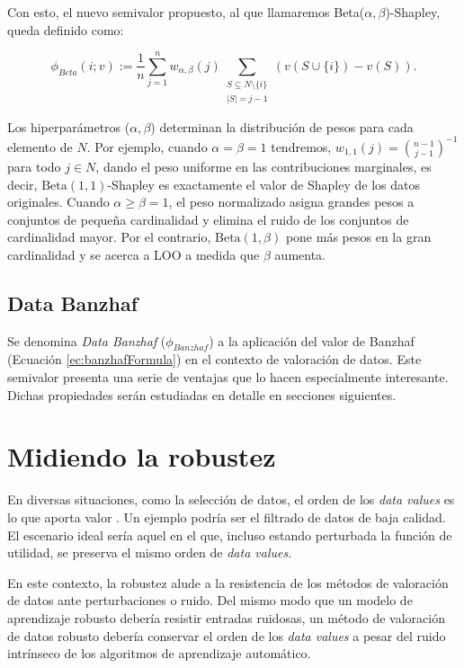 Con esto, el nuevo semivalor propuesto, al que llamaremos
Beta($\alpha, \beta$)-Shapley, queda definido como:

\begin{equation*}
  \label{eq:betaShapley}
  \phi_{Beta}(i;v) := \frac{1}{n} \sum_{j=1}^{n} 
  w_{\alpha, \beta}(j) \sum_{\substack{S \subseteq N \setminus \{i\}
  \\ |S|=j-1}}
  (v(S \cup \{i\})-v(S)).
\end{equation*}

Los hiperparámetros ($\alpha, \beta$) determinan la
distribución de pesos para cada elemento de $N$.
Por ejemplo, cuando $\alpha = \beta = 1$ tendremos,
$w_{1,1}(j) = \binom{n-1}{j-1}^{-1}$ para todo $j \in N$,
dando el peso uniforme en las contribuciones marginales,
es decir, $\text{Beta}(1,1)$-Shapley es exactamente
el valor de Shapley de los datos originales.
Cuando $\alpha \geq \beta = 1$, el peso normalizado asigna
grandes pesos a conjuntos de pequeña cardinalidad y elimina
el ruido de los conjuntos de cardinalidad mayor.
Por el contrario, $\text{Beta}(1,\beta)$ pone más pesos en
la gran cardinalidad y se acerca a LOO a medida que $\beta$
aumenta.

\subsection*{Data Banzhaf}
Se denomina \textit{Data Banzhaf} ($\phi_{Banzhaf}$)
 a la aplicación del valor de
Banzhaf (Ecuación \ref{ec:banzhafFormula}) en el
contexto de valoración de datos. Este semivalor presenta una
serie de ventajas que lo hacen especialmente interesante. Dichas
propiedades serán estudiadas en detalle en secciones
siguientes. 

\newpage
\section{Midiendo la robustez}

En diversas situaciones, como la selección de datos, el orden
de los \textit{data values} es lo que aporta valor \cite{betaShapley}.
Un ejemplo podría ser el filtrado de datos de baja calidad.
El escenario ideal sería aquel en el que, incluso
estando perturbada la función de utilidad, se preserva
el mismo orden de \textit{data values}.

En este contexto, la robustez alude a la resistencia
de los métodos de valoración de datos ante perturbaciones
o ruido. Del mismo modo que un modelo de aprendizaje robusto
debería resistir entradas ruidosas, un método de valoración de
datos robusto debería conservar el orden de los \textit{data values} a pesar
del ruido intrínseco de los algoritmos
de aprendizaje automático.

